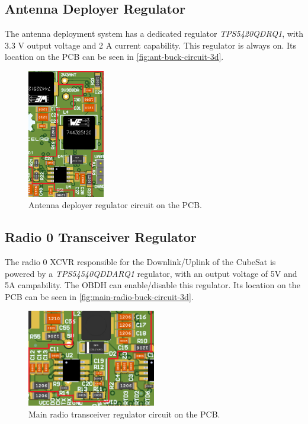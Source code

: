 \subsection{Antenna Deployer Regulator}

The antenna deployment system has a dedicated regulator \textit{TPS5420QDRQ1}, with 3.3 V output voltage and 2 A current capability. This regulator is always on.
Its location on the PCB can be seen in \autoref{fig:ant-buck-circuit-3d}.

\begin{figure}[!ht]
    \begin{center}
        \includegraphics[width=0.3\textwidth]{figures/ant-buck-circuit-3d.png}
        \caption{Antenna deployer regulator circuit on the PCB.}
        \label{fig:ant-buck-circuit-3d}
    \end{center}
\end{figure}

\subsection{Radio 0 Transceiver Regulator}

The radio 0 XCVR responsible for the Downlink/Uplink of the CubeSat is powered by a \textit{TPS54540QDDARQ1} regulator, with an output voltage of 5V and 5A campability. The OBDH can enable/disable this regulator.
Its location on the PCB can be seen in \autoref{fig:main-radio-buck-circuit-3d}.

\begin{figure}[!ht]
    \begin{center}
        \includegraphics[width=0.5\textwidth]{figures/main-radio-buck-circuit-3d.png}
        \caption{Main radio transceiver regulator circuit on the PCB.}
        \label{fig:main-radio-buck-circuit-3d}
    \end{center}
\end{figure}

